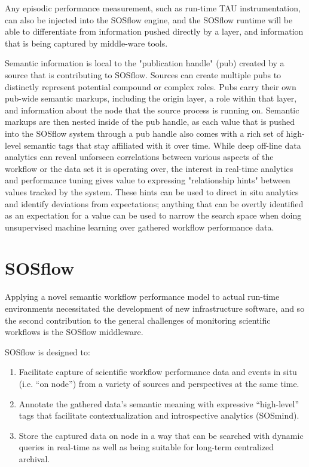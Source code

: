 Any episodic performance measurement, such as run-time TAU
instrumentation, can also be injected into the SOSflow engine, and the
SOSflow runtime will be able to differentiate from information pushed
directly by a layer, and information that is being captured by
middle-ware tools.


Semantic information is local to the "publication handle" (pub)
created by a source that is contributing to SOSflow.  Sources can
create multiple pubs to distinctly represent potential compound or
complex roles. Pubs carry their own pub-wide semantic markups,
including the origin layer, a role within that layer, and information
about the node that the source process is running on. Semantic markups
are then nested inside of the pub handle, as each value that is pushed
into the SOSflow system through a pub handle also comes with a rich
set of high-level semantic tags that stay affiliated with it over
time. While deep off-line data analytics can reveal unforseen
correlations between various aspects of the workflow or the data set
it is operating over, the interest in real-time analytics and
performance tuning gives value to expressing "relationship hints"
between values tracked by the system. These hints can be used to
direct in situ analytics and identify deviations from expectations;
anything that can be overtly identified as an expectation for a value
can be used to narrow the search space when doing unsupervised machine
learning over gathered workflow performance data.

\section{SOSflow}
Applying a novel semantic workflow performance model to actual
run-time environments necessitated the development of new
infrastructure software, and so the second contribution to the general
challenges of monitoring scientific workflows is the SOSflow middleware.

SOSflow is designed to:
\begin{enumerate}
\item Facilitate capture of scientific workflow performance data and
  events in situ (i.e. ``on node'') from a variety of sources and
  perspectives at the same time.
\item Annotate the gathered data's semantic meaning with expressive
  ``high-level'' tags that facilitate contextualization and
  introspective analytics (SOSmind).
\item Store the captured data on node in a way that can be searched
  with dynamic queries in real-time as well as being suitable for
  long-term centralized archival.
\end{enumerate}

